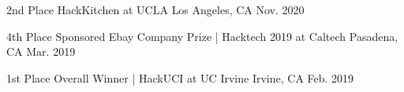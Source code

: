 



\begin{cvhonors}
  \cvhonor
    {2nd Place} %
    {HackKitchen at UCLA} %
    {Los Angeles, CA} %
    {Nov. 2020} %
    
  \cvhonor
    {4th Place} %
    {Sponsored Ebay Company Prize | Hacktech 2019 at Caltech} %
    {Pasadena, CA} %
    {Mar. 2019} %

  \cvhonor
    {1st Place} %
    {Overall Winner | HackUCI at UC Irvine} %
    {Irvine, CA} %
    {Feb. 2019} %
    
\end{cvhonors}